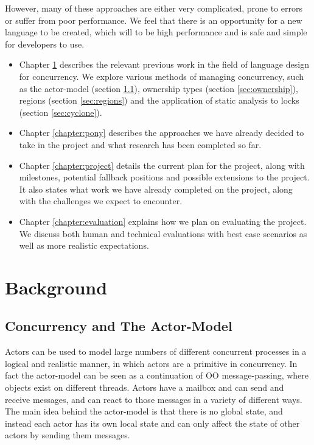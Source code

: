 \documentclass[11pt,a4paper]{report}
\begin{document}
However, many of these approaches are either very complicated, prone to errors or suffer from poor performance.
We feel that there is an opportunity for a new language to be created, which will to be high performance and is safe and simple for developers to use.
\\
\begin{itemize}
\item Chapter \ref{chapter:background} describes the relevant previous work in the field of language design for concurrency.
	We explore various methods of managing concurrency, such as the actor-model (section \ref{sec:actor}), ownership types (section \ref{sec:ownership}), regions (section \ref{sec:regions}) and the application of static analysis to locks (section \ref{sec:cyclone}).
\item Chapter \ref{chapter:pony} describes the approaches we have already decided to take in the project and what research has been completed so far.
\item Chapter \ref{chapter:project} details the current plan for the project, along with milestones, potential fallback positions and possible extensions to the project.
	It also states what work we have already completed on the project, along with the challenges we expect to encounter.
\item Chapter \ref{chapter:evaluation} explains how we plan on evaluating the project. 
	We discuss both human and technical evaluations with best case scenarios as well as more realistic expectations.
\end{itemize}

\newpage
\chapter{Background}
\label{chapter:background}

\section{Concurrency and The Actor-Model}
\label{sec:actor}

Actors can be used to model large numbers of different concurrent processes in a logical and realistic manner, in which actors are a primitive in concurrency.
In fact the actor-model can be seen as a continuation of OO message-passing, where objects exist on different threads.
Actors have a mailbox and can send and receive messages, and can react to those messages in a variety of different ways.
The main idea behind the actor-model is that there is no global state, and instead each actor has its own local state and can only affect the state of other actors by sending them messages.
\end{document}
